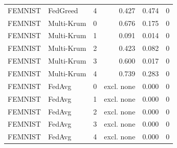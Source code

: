 \begin{tabular}{llrrrr}
FEMNIST & FedGreed & 4 & 0.427 & 0.474 & 0 \\
FEMNIST & Multi-Krum & 0 & 0.676 & 0.175 & 0 \\
FEMNIST & Multi-Krum & 1 & 0.091 & 0.014 & 0 \\
FEMNIST & Multi-Krum & 2 & 0.423 & 0.082 & 0 \\
FEMNIST & Multi-Krum & 3 & 0.600 & 0.017 & 0 \\
FEMNIST & Multi-Krum & 4 & 0.739 & 0.283 & 0 \\
FEMNIST & FedAvg & 0 & excl. none & 0.000 & 0 \\
FEMNIST & FedAvg & 1 & excl. none & 0.000 & 0 \\
FEMNIST & FedAvg & 2 & excl. none & 0.000 & 0 \\
FEMNIST & FedAvg & 3 & excl. none & 0.000 & 0 \\
FEMNIST & FedAvg & 4 & excl. none & 0.000 & 0 \\
\bottomrule
\end{tabular}
